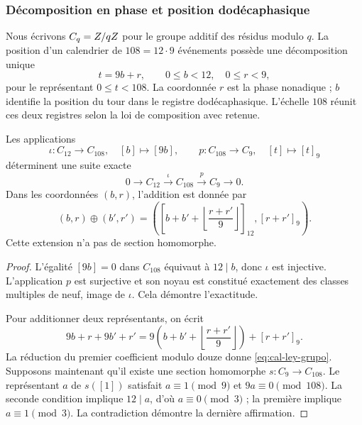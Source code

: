 \subsubsection{Décomposition en phase et position dodécaphasique}

Nous écrivons $C_q=Z/qZ$ pour le groupe additif des résidus modulo $q$.
La position d’un calendrier de $108=12\cdot9$ événements possède une
décomposition unique
\[
 t=9b+r,\qquad 0\leq b<12,\quad0\leq r<9,
\]
pour le représentant $0\leq t<108$. La coordonnée $r$ est la phase
nonadique ; $b$ identifie la position du tour dans le registre
dodécaphasique. L’échelle $108$ réunit ces deux registres selon la loi de
composition avec retenue.

\begin{teorema}
\label{thm:cal-extension}
Les applications
\[
 \iota:C_{12}\longrightarrow C_{108},\quad[b]\longmapsto[9b],
 \qquad p:C_{108}\longrightarrow C_9,\quad[t]\longmapsto[t]_9
\]
déterminent une suite exacte
\begin{equation}
 0\longrightarrow C_{12}\xrightarrow{\ \iota\ }C_{108}
 \xrightarrow{\ p\ }C_9\longrightarrow0.
 \label{eq:cal-extension}
\end{equation}
Dans les coordonnées $(b,r)$, l’addition est donnée par
\begin{equation}
 (b,r)\oplus(b',r')=
 \left(\left[b+b'+\left\lfloor\frac{r+r'}9\right\rfloor\right]_{12},
 [r+r']_9\right).
 \label{eq:cal-ley-grupo}
\end{equation}
Cette extension n’a pas de section homomorphe.
\end{teorema}
\begin{proof}
L’égalité $[9b]=0$ dans $C_{108}$ équivaut à $12\mid b$, donc
$\iota$ est injective. L’application $p$ est surjective et son noyau
est constitué exactement des classes multiples de neuf, image de
$\iota$. Cela démontre l’exactitude.

Pour additionner deux représentants, on écrit
\[
 9b+r+9b'+r'
 =9\left(b+b'+\left\lfloor\frac{r+r'}9\right\rfloor\right)
   +[r+r']_9.
\]
La réduction du premier coefficient modulo douze donne
\eqref{eq:cal-ley-grupo}. Supposons maintenant qu’il existe une section
homomorphe $s:C_9\to C_{108}$. Le représentant $a$ de $s([1])$
satisfait $a\equiv1\pmod9$ et $9a\equiv0\pmod{108}$. La seconde
condition implique $12\mid a$, d’où $a\equiv0\pmod3$ ; la première
implique $a\equiv1\pmod3$. La contradiction démontre la dernière
affirmation.
\end{proof}

